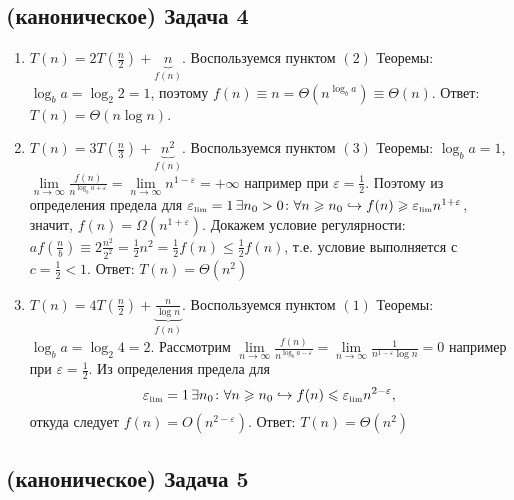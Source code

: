 \documentclass[a4paper]{article}
\def\eps{\varepsilon}
\begin{document}
\subsection*{(каноническое) Задача 4}
\begin{enumerate}
\item $T(n)=2T(\frac{n}{2})+\underbrace{n}_{f(n)}$. Воспользуемся пунктом $(2)$ Теоремы: $\log_b a=\log_2 2=1$, поэтому $f(n)\equiv n=\Theta(n^{\log_b a})\equiv\Theta(n)$.\newline
Ответ: $\boxed{T(n)=\Theta(n\log n)}$.
\item $T(n)=3T(\frac{n}{3})+\underbrace{n^2}_{f(n)}$. Воспользуемся пунктом $(3)$ Теоремы: $\log_b a=1$, $\lim\limits_{n\to\infty}\frac{f(n)}{n^{\log_b a+\eps}}=\lim\limits_{n\to\infty}n^{1-\eps}=+\infty$ например при $\eps=\frac{1}{2}$. Поэтому из определения предела для $\eps_{\mbox{\tiny lim}}=1\,\exists n_0>0\colon\forall n\geqslant n_0\hookrightarrow f(n)\geqslant \eps_{\mbox{\tiny lim}} n^{1+\eps}$, значит, $f(n)=\Omega(n^{1+\eps})$. Докажем условие регулярности: $af(\frac{n}{b})\equiv 2\frac{n^2}{2^2}=\frac{1}{2}n^2=\frac{1}{2}f(n)\leqslant\frac{1}{2}f(n)$, т.е. условие выполняется с $c=\frac{1}{2}<1$.\newline
Ответ: $\boxed{T(n)=\Theta(n^2)}$
\item $T(n)=4T(\frac{n}{2})+\underbrace{\frac{n}{\log n}}_{f(n)}$. Воспользуемся пунктом $(1)$ Теоремы: $\log_b a=\log_2 4=2$.\newline
Рассмотрим $\lim\limits_{n\to\infty}\frac{f(n)}{n^{\log_b a-\eps}}=\lim\limits_{n\to\infty}\frac{1}{n^{1-\eps}\log n}=0$ например при $\eps=\frac{1}{2}$. Из определения предела для $$\eps_{\mbox{\tiny lim}}=1\,\exists n_0\colon\forall n\geqslant n_0\hookrightarrow f(n)\leqslant \eps_{\mbox{\tiny lim}} n^{2-\eps},$$ откуда следует $f(n)=O(n^{2-\eps})$.\newline
Ответ: $\boxed{T(n)=\Theta(n^2)}$
\end{enumerate}
\subsection*{(каноническое) Задача 5}
\end{document}
